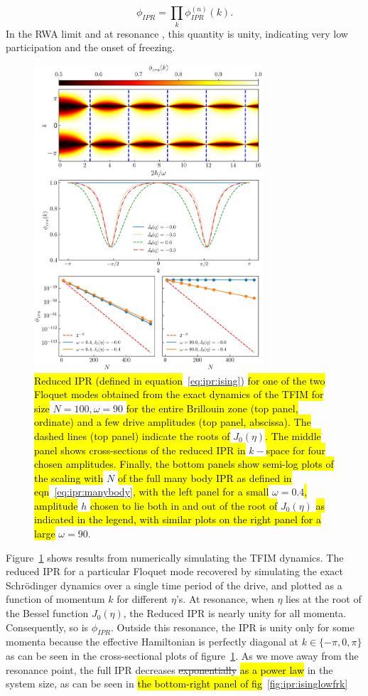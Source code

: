 \documentclass[%
reprint,
superscriptaddress,
linenumbers,
amsmath,amssymb,
aps,
prb,
showkeys,
]{revtex4-2}
\begin{document}
	\begin{equation}
		\label{eq:ipr:manybody}
		\phi_{IPR} = \prod_k \phi^{(n)}_{IPR}(k).
	\end{equation}
	In the RWA limit and at resonance , this quantity is unity, indicating very low participation and the onset of freezing.
	\begin{figure}[t!]
		\centering
		\includegraphics[width = 8.5cm]{ising_exact_ipr_3panel.jpeg}
		\caption{\hl{Reduced IPR (defined in equation}~\ref{eq:ipr:ising}) \hl{for one of the two Floquet modes obtained from the exact dynamics of the TFIM for size} $N = 100, \omega=90$ \hl{for the entire Brillouin zone (top panel, ordinate) and a few drive amplitudes (top panel, abscissa). The dashed lines (top panel) indicate the roots of} $J_0(\eta)$\hl{. The middle panel shows cross-sections of the reduced IPR in} $k-$\hl{space for four chosen amplitudes. Finally, the bottom panels show semi-log plots of the scaling with} $N$ \hl{of the full many body IPR as defined in eqn}~\ref{eq:ipr:manybody}\hl{, with the left panel for a small} $\omega=0.4$\hl{, amplitude} $h$ \hl{chosen to lie both in and out of the root of} $J_0(\eta)$ \hl{as indicated in the legend, with similar plots on the right panel for a large} $\omega=90$. }
		\label{fig:ipr:tfim}
	\end{figure}
	Figure~\ref{fig:ipr:tfim} shows results from numerically simulating the TFIM dynamics. The reduced IPR for a particular Floquet mode recovered by simulating the exact Schr\"odinger dynamics over a single time period of the drive, and plotted as a function of momentum $k$ for different $\eta$'s. At resonance, when $\eta$ lies at the root of the Bessel function $J_0(\eta)$,  the {Reduced} IPR is {nearly} unity for all momenta. {Consequently, so is} $\phi_{IPR}$.  Outside this resonance, the IPR is unity only for some momenta because the effective Hamiltonian is perfectly diagonal at $k \in{\{-\pi, 0, \pi\}}$ as can be seen in the cross-sectional plots of figure~\ref{fig:ipr:tfim}. {As we move away from the resonance point,
	the full IPR decreases \st{exponentially} \hl{as a power law} in the system size, as can be seen in \hl{the bottom-right panel of fig}~\ref{fig:ipr:isinglowfrk}}
\end{document}
